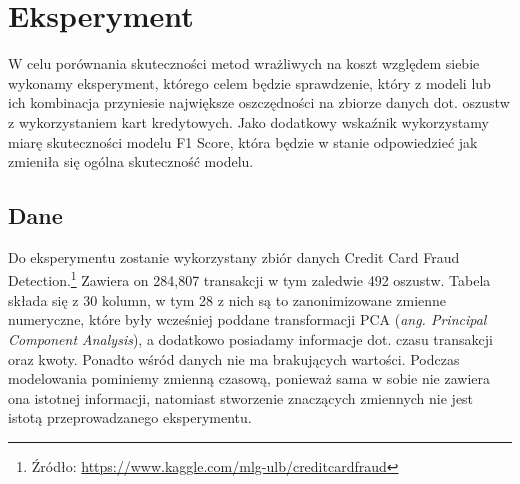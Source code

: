 \documentclass[inzynierska]{pwr_wmat_praca_dyplomowa}
\theoremstyle{plain}
\numberwithin{theorem}{chapter}
\theoremstyle{definition}
\numberwithin{theorem}{chapter}
\begin{document}
\chapter{Eksperyment}
W celu porównania skuteczności metod wrażliwych na koszt względem siebie wykonamy eksperyment, którego celem będzie sprawdzenie, który z modeli lub ich kombinacja przyniesie największe oszczędności na zbiorze danych dot. oszustw z wykorzystaniem kart kredytowych. Jako dodatkowy wskaźnik wykorzystamy miarę skuteczności modelu F1 Score, która będzie w stanie odpowiedzieć jak zmieniła się ogólna skuteczność modelu.


\section{Dane}
Do eksperymentu zostanie wykorzystany zbiór danych Credit Card Fraud Detection.\footnote{Źródło: \url{https://www.kaggle.com/mlg-ulb/creditcardfraud}} Zawiera on 284,807 transakcji w tym zaledwie 492 oszustw. Tabela składa się z 30 kolumn, w tym 28 z nich są to zanonimizowane zmienne numeryczne, które były wcześniej poddane transformacji PCA (\textit{ang. Principal Component Analysis}), a dodatkowo posiadamy informacje dot. czasu transakcji oraz kwoty. Ponadto wśród danych nie ma brakujących wartości. Podczas modelowania pominiemy zmienną czasową, ponieważ sama w sobie nie zawiera ona istotnej informacji, natomiast stworzenie znaczących zmiennych nie jest istotą przeprowadzanego eksperymentu. 
\end{document}
